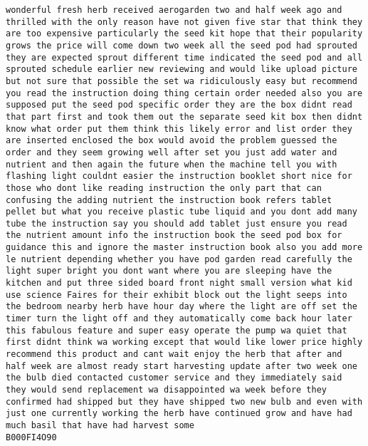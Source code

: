 \documentclass[11pt]{article}
\begin{document}
\begin{Verbatim}[commandchars=\\\{\}]
wonderful fresh herb received aerogarden two and half week ago and thrilled with the only reason have not given five star that think they are too expensive particularly the seed kit hope that their popularity grows the price will come down two week all the seed pod had sprouted they are expected sprout different time indicated the seed pod and all sprouted schedule earlier new reviewing and would like upload picture but not sure that possible the set wa ridiculously easy but recommend you read the instruction doing thing certain order needed also you are supposed put the seed pod specific order they are the box didnt read that part first and took them out the separate seed kit box then didnt know what order put them think this likely error and list order they are inserted enclosed the box would avoid the problem guessed the order and they seem growing well after set you just add water and nutrient and then again the future when the machine tell you with flashing light couldnt easier the instruction booklet short nice for those who dont like reading instruction the only part that can confusing the adding nutrient the instruction book refers tablet pellet but what you receive plastic tube liquid and you dont add many tube the instruction say you should add tablet just ensure you read the nutrient amount info the instruction book the seed pod box for guidance this and ignore the master instruction book also you add more le nutrient depending whether you have pod garden read carefully the light super bright you dont want where you are sleeping have the kitchen and put three sided board front night small version what kid use science Faires for their exhibit block out the light seeps into the bedroom nearby herb have hour day where the light are off set the timer turn the light off and they automatically come back hour later this fabulous feature and super easy operate the pump wa quiet that first didnt think wa working except that would like lower price highly recommend this product and cant wait enjoy the herb that after and half week are almost ready start harvesting update after two week one the bulb died contacted customer service and they immediately said they would send replacement wa disappointed wa week before they confirmed had shipped but they have shipped two new bulb and even with just one currently working the herb have continued grow and have had much basil that have had harvest some
B000FI4O90


\end{Verbatim}
\end{document}
